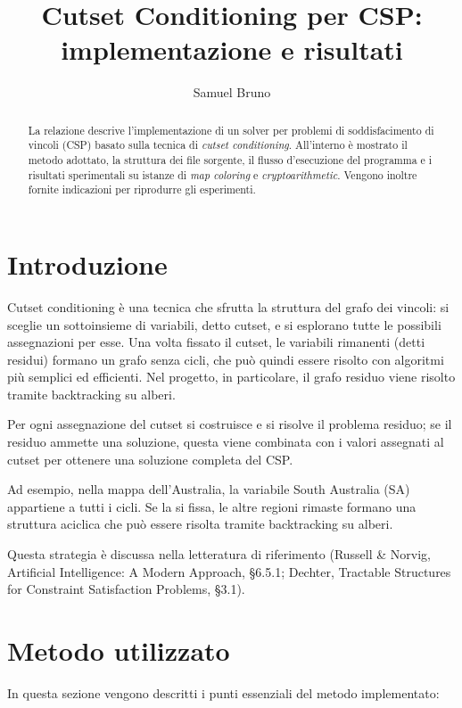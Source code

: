 \documentclass[a4paper,11pt]{article}
\title{Cutset Conditioning per CSP: implementazione e risultati}
\author{Samuel Bruno}
\date{}
\begin{document}
\maketitle

\begin{abstract}
La relazione descrive l'implementazione di un solver per problemi di soddisfacimento di vincoli (CSP) basato sulla tecnica di \emph{cutset conditioning}. All'interno è mostrato il metodo adottato, la struttura dei file sorgente, il flusso d'esecuzione del programma e i risultati sperimentali su istanze di \emph{map coloring} e \emph{cryptoarithmetic}. Vengono inoltre fornite indicazioni per riprodurre gli esperimenti.
\end{abstract}

\section{Introduzione}
Cutset conditioning è una tecnica che sfrutta la struttura del grafo dei vincoli: si sceglie un sottoinsieme di variabili, detto cutset, e si esplorano tutte le possibili assegnazioni per esse. Una volta fissato il cutset, le variabili rimanenti (detti residui) formano un grafo senza cicli, che può quindi essere risolto con algoritmi più semplici ed efficienti. Nel progetto, in particolare, il grafo residuo viene risolto tramite backtracking su alberi.

Per ogni assegnazione del cutset si costruisce e si risolve il problema residuo; se il residuo ammette una soluzione, questa viene combinata con i valori assegnati al cutset per ottenere una soluzione completa del CSP.

Ad esempio, nella mappa dell’Australia, la variabile South Australia (SA) appartiene a tutti i cicli. Se la si fissa, le altre regioni rimaste formano una struttura aciclica che può essere risolta tramite backtracking su alberi.

Questa strategia è discussa nella letteratura di riferimento (Russell \& Norvig, Artificial Intelligence: A Modern Approach, §6.5.1; Dechter, Tractable Structures for Constraint Satisfaction Problems, §3.1).

\section{Metodo utilizzato}
In questa sezione vengono descritti i punti essenziali del metodo implementato:
\end{document}
